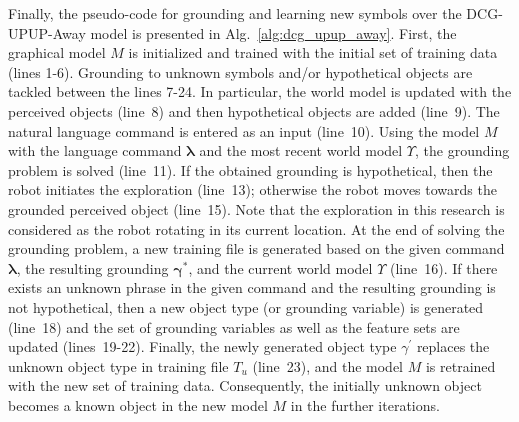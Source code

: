 Finally, the pseudo-code for grounding and learning new symbols over the DCG-UPUP-Away model is presented in Alg.~\ref{alg:dcg_upup_away}. First, the graphical model $M$ is initialized and trained with the initial set of training data (lines 1-6). Grounding to unknown symbols and/or hypothetical objects are tackled between the lines 7-24. In particular, the world model is updated with the perceived objects (line~8) and then hypothetical objects are added (line~9). The natural language command is entered as an input (line~10). Using the model $M$ with the language command $\boldsymbol\lambda$ and the most recent world model $\Upsilon$, the grounding problem is solved (line~11). If the obtained grounding is hypothetical, then the robot initiates the exploration (line~13); otherwise the robot moves towards the grounded perceived object (line~15). Note that the exploration in this research is considered as the robot rotating in its current location. At the end of solving the grounding problem, a new training file is generated based on the given command $\boldsymbol\lambda$, the resulting grounding $\boldsymbol\gamma^*$, and the current world model $\Upsilon$ (line~16). If there exists an unknown phrase in the given command and the resulting grounding is not hypothetical, then a new object type (or grounding variable) is generated (line~18) and the set of grounding variables as well as the feature sets are updated (lines~19-22). Finally, the newly generated object type $\gamma^\prime$ replaces the unknown object type in training file $T_u$ (line~23), and the model $M$ is retrained with the new set of training data. Consequently, the initially unknown object becomes a known object in the new model $M$ in the further iterations. 

